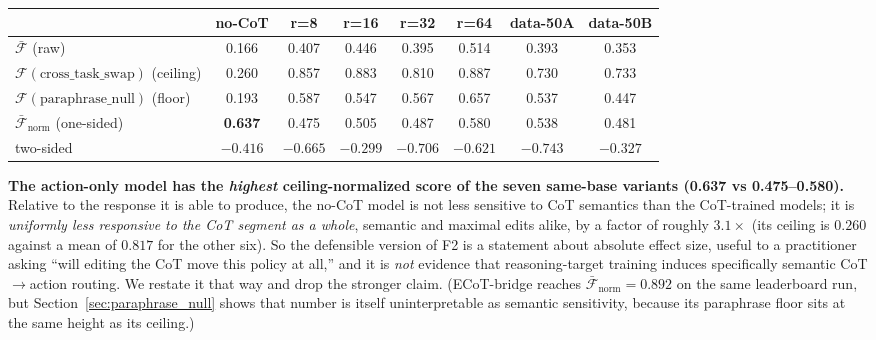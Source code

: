 \documentclass{article}
\begin{document}
\begin{center}\small
\begin{tabular}{lccccccc}
\toprule
& no-CoT & r=8 & r=16 & r=32 & r=64 & data-50A & data-50B \\
\midrule
$\bar{\mathcal{F}}$ (raw) & 0.166 & 0.407 & 0.446 & 0.395 & 0.514 & 0.393 & 0.353 \\
$\mathcal{F}(\text{cross\_task\_swap})$ (ceiling) & 0.260 & 0.857 & 0.883 & 0.810 & 0.887 & 0.730 & 0.733 \\
$\mathcal{F}(\text{paraphrase\_null})$ (floor) & 0.193 & 0.587 & 0.547 & 0.567 & 0.657 & 0.537 & 0.447 \\
\midrule
$\bar{\mathcal{F}}_{\text{norm}}$ (one-sided) & \textbf{0.637} & 0.475 & 0.505 & 0.487 & 0.580 & 0.538 & 0.481 \\
two-sided & $-0.416$ & $-0.665$ & $-0.299$ & $-0.706$ & $-0.621$ & $-0.743$ & $-0.327$ \\
\bottomrule
\end{tabular}
\end{center}

\textbf{The action-only model has the \emph{highest} ceiling-normalized score of the seven same-base variants (0.637 vs 0.475--0.580).} Relative to the response it is able to produce, the no-CoT model is not less sensitive to CoT semantics than the CoT-trained models; it is \emph{uniformly less responsive to the CoT segment as a whole}, semantic and maximal edits alike, by a factor of roughly $3.1\times$ (its ceiling is $0.260$ against a mean of $0.817$ for the other six). So the defensible version of F2 is a statement about absolute effect size, useful to a practitioner asking ``will editing the CoT move this policy at all,'' and it is \emph{not} evidence that reasoning-target training induces specifically semantic CoT$\to$action routing. We restate it that way and drop the stronger claim. (ECoT-bridge reaches $\bar{\mathcal{F}}_{\text{norm}} = 0.892$ on the same leaderboard run, but Section~\ref{sec:paraphrase_null} shows that number is itself uninterpretable as semantic sensitivity, because its paraphrase floor sits at the same height as its ceiling.)
\end{document}
